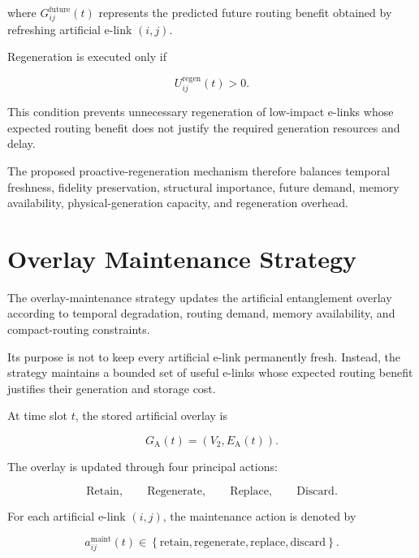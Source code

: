 where $G_{ij}^{\mathrm{future}}(t)$ represents the predicted future routing benefit obtained by refreshing artificial e-link $(i,j)$.

Regeneration is executed only if

\begin{equation}
    U_{ij}^{\mathrm{regen}}(t)
    >
    0.
\end{equation}

This condition prevents unnecessary regeneration of low-impact e-links whose expected routing benefit does not justify the required generation resources and delay.

The proposed proactive-regeneration mechanism therefore balances temporal freshness, fidelity preservation, structural importance, future demand, memory availability, physical-generation capacity, and regeneration overhead.
\section{Overlay Maintenance Strategy}

The overlay-maintenance strategy updates the artificial entanglement overlay according to temporal degradation, routing demand, memory availability, and compact-routing constraints.

Its purpose is not to keep every artificial e-link permanently fresh. Instead, the strategy maintains a bounded set of useful e-links whose expected routing benefit justifies their generation and storage cost.

At time slot $t$, the stored artificial overlay is

\begin{equation}
    G_{\mathrm{A}}(t)
    =
    \left(
    V_2,
    E_{\mathrm{A}}(t)
    \right).
\end{equation}

The overlay is updated through four principal actions:

\begin{equation}
    \mathrm{Retain},
    \qquad
    \mathrm{Regenerate},
    \qquad
    \mathrm{Replace},
    \qquad
    \mathrm{Discard}.
\end{equation}

For each artificial e-link $(i,j)$, the maintenance action is denoted by

\begin{equation}
    a_{ij}^{\mathrm{maint}}(t)
    \in
    \left\{
    \mathrm{retain},
    \mathrm{regenerate},
    \mathrm{replace},
    \mathrm{discard}
    \right\}.
\end{equation}


